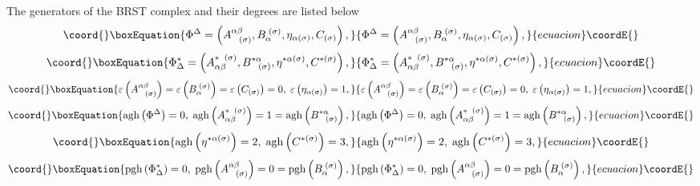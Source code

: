 \documentclass[a4paper,12pt]{article}
\begin{document}
The generators of the BRST complex and their degrees are listed below 
\begin{equation}\coord{}\boxEquation{
\Phi ^{\Delta }=\left( A_{\;\;\;(\sigma )}^{\alpha \beta },B_{\alpha
}^{\;(\sigma )},\eta _{\alpha (\sigma )},C_{(\sigma )}\right) ,
\label{fcola7}
}{
\Phi ^{\Delta }=\left( A_{\;\;\;(\sigma )}^{\alpha \beta },B_{\alpha
}^{\;(\sigma )},\eta _{\alpha (\sigma )},C_{(\sigma )}\right) ,
}{ecuacion}\coordE{}\end{equation}
\begin{equation}\coord{}\boxEquation{
\Phi _{\Delta }^{*}=\left( A_{\alpha \beta }^{*\;\;(\sigma
)},B_{\;\;\;(\sigma )}^{*\alpha },\eta ^{*\alpha (\sigma )},C^{*(\sigma
)}\right) ,  \label{fcola7a}
}{
\Phi _{\Delta }^{*}=\left( A_{\alpha \beta }^{*\;\;(\sigma
)},B_{\;\;\;(\sigma )}^{*\alpha },\eta ^{*\alpha (\sigma )},C^{*(\sigma
)}\right) ,  }{ecuacion}\coordE{}\end{equation}
\begin{equation}\coord{}\boxEquation{
\varepsilon \left( A_{\;\;\;(\sigma )}^{\alpha \beta }\right) =\varepsilon
\left( B_{\alpha }^{\;(\sigma )}\right) =\varepsilon \left( C_{(\sigma
)}\right) =0,\;\varepsilon \left( \eta _{\alpha (\sigma )}\right) =1,
\label{fcola8}
}{
\varepsilon \left( A_{\;\;\;(\sigma )}^{\alpha \beta }\right) =\varepsilon
\left( B_{\alpha }^{\;(\sigma )}\right) =\varepsilon \left( C_{(\sigma
)}\right) =0,\;\varepsilon \left( \eta _{\alpha (\sigma )}\right) =1,
}{ecuacion}\coordE{}\end{equation}
\begin{equation}\coord{}\boxEquation{
\mathrm{agh}\left( \Phi ^{\Delta }\right) =0,\;\mathrm{agh}\left( A_{\alpha
\beta }^{*\;\;(\sigma )}\right) =1=\mathrm{agh}\left( B_{\;\;\;(\sigma
)}^{*\alpha }\right) ,  \label{fcola9}
}{
\mathrm{agh}\left( \Phi ^{\Delta }\right) =0,\;\mathrm{agh}\left( A_{\alpha
\beta }^{*\;\;(\sigma )}\right) =1=\mathrm{agh}\left( B_{\;\;\;(\sigma
)}^{*\alpha }\right) ,  }{ecuacion}\coordE{}\end{equation}
\begin{equation}\coord{}\boxEquation{
\mathrm{agh}\left( \eta ^{*\alpha (\sigma )}\right) =2,\;\mathrm{agh}\left(
C^{*(\sigma )}\right) =3,  \label{fcola10}
}{
\mathrm{agh}\left( \eta ^{*\alpha (\sigma )}\right) =2,\;\mathrm{agh}\left(
C^{*(\sigma )}\right) =3,  }{ecuacion}\coordE{}\end{equation}
\begin{equation}\coord{}\boxEquation{
\mathrm{pgh}\left( \Phi _{\Delta }^{*}\right) =0,\;\mathrm{pgh}\left(
A_{\;\;\;(\sigma )}^{\alpha \beta }\right) =0=\mathrm{pgh}\left( B_{\alpha
}^{\;(\sigma )}\right) ,  \label{fcola11}
}{
\mathrm{pgh}\left( \Phi _{\Delta }^{*}\right) =0,\;\mathrm{pgh}\left(
A_{\;\;\;(\sigma )}^{\alpha \beta }\right) =0=\mathrm{pgh}\left( B_{\alpha
}^{\;(\sigma )}\right) ,  }{ecuacion}\coordE{}\end{equation}
\end{document}
